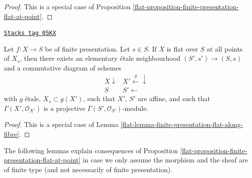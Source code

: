 \begin{proof}

This is a special case of
Proposition \ref{flat-proposition-finite-presentation-flat-at-point}.
\end{proof}

\begin{lemma}
\label{flat-lemma-finite-presentation-flat-along-fibre-X}
\href{https://stacks.math.columbia.edu/tag/05KX}{\texttt{Stacks tag 05KX}}

Let $f : X \to S$ be of finite presentation.
Let $s \in S$.
If $X$ is flat over $S$ at all points of $X_s$, then
there exists an elementary \'etale neighbourhood
$(S', s') \to (S, s)$ and a commutative diagram of schemes
$$
\begin{array}{cc}X \downarrow & X' \overset{g}{\longleftarrow}\downarrow \\ S & S' \longleftarrow\end{array}
$$
with $g$ \'etale, $X_s \subset g(X')$, such that $X'$, $S'$
are affine, and such that
$\Gamma(X', \mathcal{O}_{X'})$ is a projective
$\Gamma(S', \mathcal{O}_{S'})$-module.
\end{lemma}

\begin{proof}

This is a special case of
Lemma \ref{flat-lemma-finite-presentation-flat-along-fibre}.
\end{proof}

The following lemmas explain consequences of
Proposition \ref{flat-proposition-finite-presentation-flat-at-point}
in case we only assume the morphism and the sheaf are of finite type
(and not necessarily of finite presentation).

